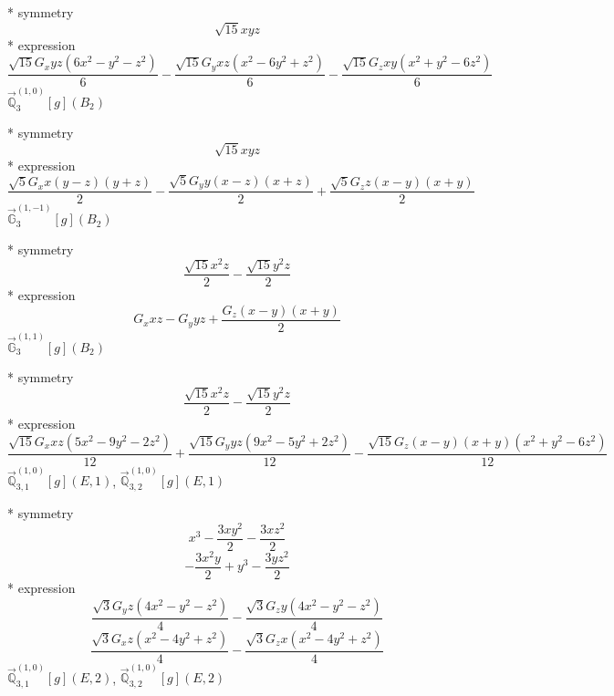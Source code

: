 \documentclass[fleqn,8pt]{jsarticle}
\begin{document}
\noindent\quad ** symmetry
\begin{dmath*}
\sqrt{15} x y z
\end{dmath*}
\noindent\quad ** expression
\begin{dmath*}
\frac{\sqrt{15} G_{x} y z \left(6 x^{2} - y^{2} - z^{2}\right)}{6} - \frac{\sqrt{15} G_{y} x z \left(x^{2} - 6 y^{2} + z^{2}\right)}{6} - \frac{\sqrt{15} G_{z} x y \left(x^{2} + y^{2} - 6 z^{2}\right)}{6}
\end{dmath*}
\noindent\quad $\vec{\mathbb{Q}}_{3}^{(1,0)}[g](B_{2})$

\noindent\quad ** symmetry
\begin{dmath*}
\sqrt{15} x y z
\end{dmath*}
\noindent\quad ** expression
\begin{dmath*}
\frac{\sqrt{5} G_{x} x \left(y - z\right) \left(y + z\right)}{2} - \frac{\sqrt{5} G_{y} y \left(x - z\right) \left(x + z\right)}{2} + \frac{\sqrt{5} G_{z} z \left(x - y\right) \left(x + y\right)}{2}
\end{dmath*}
\noindent\quad $\vec{\mathbb{G}}_{3}^{(1,-1)}[g](B_{2})$

\noindent\quad ** symmetry
\begin{dmath*}
\frac{\sqrt{15} x^{2} z}{2} - \frac{\sqrt{15} y^{2} z}{2}
\end{dmath*}
\noindent\quad ** expression
\begin{dmath*}
G_{x} x z - G_{y} y z + \frac{G_{z} \left(x - y\right) \left(x + y\right)}{2}
\end{dmath*}
\noindent\quad $\vec{\mathbb{G}}_{3}^{(1,1)}[g](B_{2})$

\noindent\quad ** symmetry
\begin{dmath*}
\frac{\sqrt{15} x^{2} z}{2} - \frac{\sqrt{15} y^{2} z}{2}
\end{dmath*}
\noindent\quad ** expression
\begin{dmath*}
\frac{\sqrt{15} G_{x} x z \left(5 x^{2} - 9 y^{2} - 2 z^{2}\right)}{12} + \frac{\sqrt{15} G_{y} y z \left(9 x^{2} - 5 y^{2} + 2 z^{2}\right)}{12} - \frac{\sqrt{15} G_{z} \left(x - y\right) \left(x + y\right) \left(x^{2} + y^{2} - 6 z^{2}\right)}{12}
\end{dmath*}
\noindent\quad $\vec{\mathbb{Q}}_{3,1}^{(1,0)}[g](E,1)$, $\vec{\mathbb{Q}}_{3,2}^{(1,0)}[g](E,1)$

\noindent\quad ** symmetry
\begin{dmath*}
x^{3} - \frac{3 x y^{2}}{2} - \frac{3 x z^{2}}{2}
\end{dmath*}
\begin{dmath*}
- \frac{3 x^{2} y}{2} + y^{3} - \frac{3 y z^{2}}{2}
\end{dmath*}
\noindent\quad ** expression
\begin{dmath*}
\frac{\sqrt{3} G_{y} z \left(4 x^{2} - y^{2} - z^{2}\right)}{4} - \frac{\sqrt{3} G_{z} y \left(4 x^{2} - y^{2} - z^{2}\right)}{4}
\end{dmath*}
\begin{dmath*}
\frac{\sqrt{3} G_{x} z \left(x^{2} - 4 y^{2} + z^{2}\right)}{4} - \frac{\sqrt{3} G_{z} x \left(x^{2} - 4 y^{2} + z^{2}\right)}{4}
\end{dmath*}
\noindent\quad $\vec{\mathbb{Q}}_{3,1}^{(1,0)}[g](E,2)$, $\vec{\mathbb{Q}}_{3,2}^{(1,0)}[g](E,2)$
\end{document}
